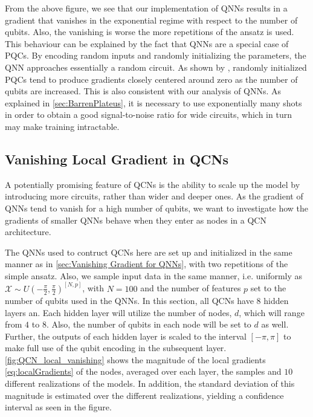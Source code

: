 From the above figure, we see that our implementation of QNNs results in a gradient that vanishes in the exponential regime with respect to the number of qubits. Also, the vanishing is worse the more repetitions of the ansatz is used. This behaviour can be explained by the fact that QNNs are a special case of PQCs. By encoding random inputs and randomly initializing the parameters, the QNN approaches essentially a random circuit. As shown by \citet{McClean_2018}, randomly initialized PQCs tend to produce gradients closely centered around zero as the number of qubits are increased. This is also consistent with our analysis of QNNs. As explained in \autoref{sec:BarrenPlateus}, it is necessary to use exponentially many shots in order to obtain a good signal-to-noise ratio for wide circuits, which in turn may make training intractable. 

\subsection{Vanishing Local Gradient in QCNs}\label{sec:Vanishing Local Gradients in QCNs}

A potentially promising feature of QCNs is the ability to scale up the model by introducing more circuits, rather than wider and deeper ones. As the gradient of QNNs tend to vanish for a high number of qubits, we want to investigate how the gradients of smaller QNNs behave when they enter as nodes in a QCN architecture. 

The QNNs used to contruct QCNs here are set up and initialized in the same manner as in \autoref{sec:Vanishing Gradient for QNNs}, with two repetitions of the simple ansatz. Also, we sample input data in the same manner, i.e. uniformly as $\mathcal{X} \sim U(-\frac{\pi}{2}, \frac{\pi}{2})^{[N,p]}$, with $N=100$ and the number of features $p$ set to the number of qubits used in the QNNs. In this section, all QCNs have 8 hidden layers an. Each hidden layer will utilize the number of nodes, $d$, which will range from $4$ to $8$. Also, the number of qubits in each node will be set to $d$ as well. Further, the outputs of each hidden layer is scaled to the interval $[-\pi, \pi]$ to make full use of the qubit encoding in the subsequent layer. \autoref{fig:QCN_local_vanishing} shows the magnitude of the local gradients \autoref{eq:localGradients} of the nodes, averaged over each layer, the samples and $10$ different realizations of the models. In addition, the standard deviation of this magnitude is estimated over the different realizations, yielding a confidence interval as seen in the figure. 

